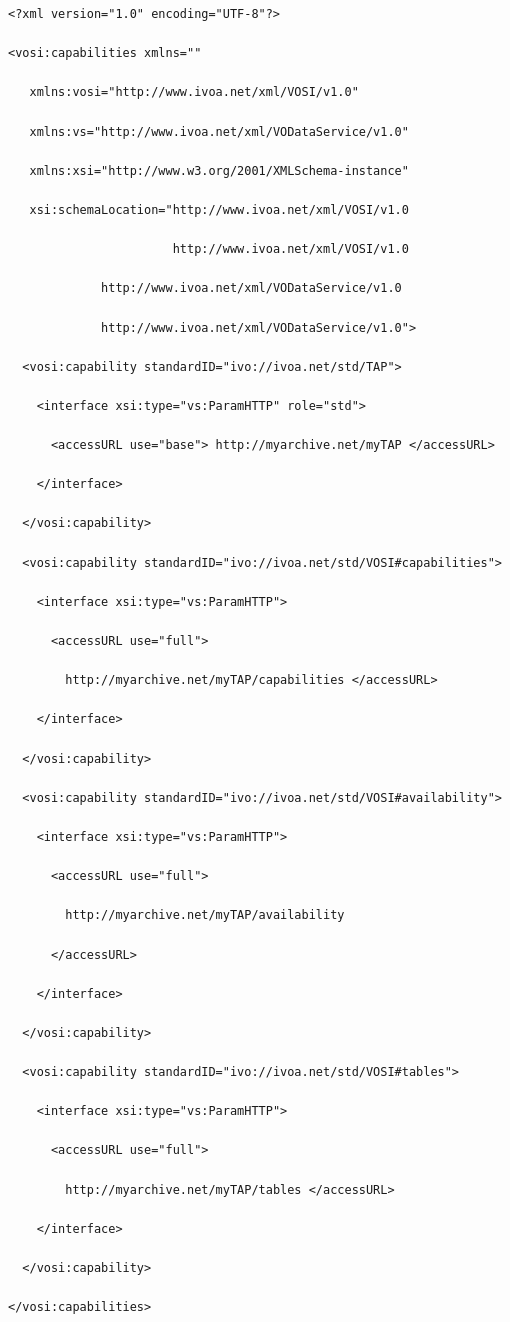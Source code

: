 \documentclass[11pt,a4paper]{ivoa}
\begin{document}
\begin{verbatim}
<?xml version="1.0" encoding="UTF-8"?>

<vosi:capabilities xmlns=""

   xmlns:vosi="http://www.ivoa.net/xml/VOSI/v1.0"

   xmlns:vs="http://www.ivoa.net/xml/VODataService/v1.0"

   xmlns:xsi="http://www.w3.org/2001/XMLSchema-instance"

   xsi:schemaLocation="http://www.ivoa.net/xml/VOSI/v1.0

                       http://www.ivoa.net/xml/VOSI/v1.0

             http://www.ivoa.net/xml/VODataService/v1.0

             http://www.ivoa.net/xml/VODataService/v1.0">

  <vosi:capability standardID="ivo://ivoa.net/std/TAP">

    <interface xsi:type="vs:ParamHTTP" role="std">

      <accessURL use="base"> http://myarchive.net/myTAP </accessURL>

    </interface>

  </vosi:capability>

  <vosi:capability standardID="ivo://ivoa.net/std/VOSI#capabilities">

    <interface xsi:type="vs:ParamHTTP">

      <accessURL use="full">

        http://myarchive.net/myTAP/capabilities </accessURL>

    </interface>

  </vosi:capability>

  <vosi:capability standardID="ivo://ivoa.net/std/VOSI#availability">

    <interface xsi:type="vs:ParamHTTP">

      <accessURL use="full">

        http://myarchive.net/myTAP/availability

      </accessURL>

    </interface>

  </vosi:capability>

  <vosi:capability standardID="ivo://ivoa.net/std/VOSI#tables">

    <interface xsi:type="vs:ParamHTTP">

      <accessURL use="full">

        http://myarchive.net/myTAP/tables </accessURL>

    </interface>

  </vosi:capability>

</vosi:capabilities>
\end{verbatim}
\end{document}
